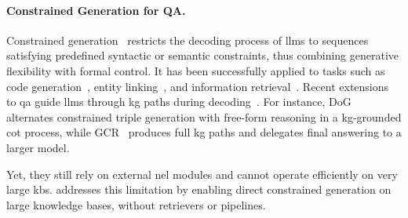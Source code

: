 



\paragraph{Constrained Generation for QA.}
Constrained generation~\cite{cao2021autoregressive,scholak-etal-2021-picard} restricts the decoding process of \acp{llm} to sequences satisfying predefined syntactic or semantic constraints, thus combining generative flexibility with formal control. It has been successfully applied to tasks such as code generation~\cite{scholak-etal-2021-picard}, entity linking~\cite{cao2021autoregressive}, and information retrieval~\cite{bevilacqua2022autoregressive}.  
Recent extensions to \ac{qa} guide \acp{llm} through \ac{kg} paths during decoding~\cite{li-etal-2025-decoding-graphs,luo2024graphconstrainedreasoningfaithfulreasoning}. For instance, DoG~\cite{li-etal-2025-decoding-graphs} alternates constrained triple generation with free-form reasoning in a \ac{kg}-grounded \acl{cot} process, while GCR~\cite{luo2024graphconstrainedreasoningfaithfulreasoning} produces full \ac{kg} paths and delegates final answering to a larger model.  

Yet, they still rely on external \acl{nel} modules and cannot operate efficiently on very large \acp{kb}.  addresses this limitation by enabling direct constrained generation on large knowledge bases, without retrievers or pipelines.